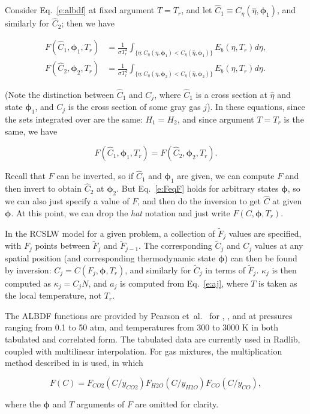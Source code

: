 \documentclass[preprint,12pt, a4paper]{elsarticle}
\newcommand{\BS}{\boldsymbol}
\begin{document}
Consider Eq.~\ref{e:albdf} at fixed argument $T=T_r$, and let $\hat{C}_1\equiv C_\eta(\hat{\eta},\BS{\phi}_1)$, and similarly for $\hat{C}_2$; then we have
%
\begin{linenomath}
    \begin{align} \label{e:albdf2}
        F(\hat{C}_1,\BS{\phi}_1,T_r) &= \frac{1}{\sigma T_r^4}\int_{\{\eta: C_\eta(\eta,\BS{\phi}_1)<C_\eta(\hat{\eta},\BS{\phi}_1)\}}E_b(\eta,T_r)d\eta, \\
        F(\hat{C}_2,\BS{\phi}_2,T_r) &= \frac{1}{\sigma T_r^4}\int_{\{\eta: C_\eta(\eta,\BS{\phi}_2)<C_\eta(\hat{\eta},\BS{\phi}_2)\}}E_b(\eta,T_r)d\eta.
    \end{align}
\end{linenomath}
%
(Note the distinction between $\hat{C}_1$ and $C_j$, where $\hat{C}_1$ is a cross section at $\hat{\eta}$ and state $\BS{\phi}_1$, and $C_j$ is the cross section of some gray gas $j$).
In these equations, since the sets integrated over are the same: $H_1=H_2$, and since argument $T=T_r$ is the same, we have 
%
\begin{linenomath}
    \begin{equation}\label{e:FeqF}
    F(\hat{C}_1,\BS{\phi}_1,T_r)=F(\hat{C}_2,\BS{\phi}_2,T_r).
\end{equation}
\end{linenomath}
%
Recall that $F$ can be inverted, so if $\hat{C}_1$ and $\BS{\phi}_1$ are given, we can compute $F$ and then invert to obtain $\hat{C}_2$ at $\BS{\phi}_2$. But Eq.~\ref{e:FeqF} holds for arbitrary states $\BS{\phi}$, so we can also just specify a value of $F$, and then do the inversion to get $\hat{C}$ at given $\BS{\phi}$. At this point, we can drop the \emph{hat} notation and just write $F(C,\BS{\phi},T_r)$.

In the RCSLW model for a given problem, a collection of $\tilde{F}_j$ values are specified, with $F_j$ points between $\tilde{F}_j$ and $\tilde{F}_{j-1}$. The corresponding $\tilde{C}_j$ and $C_j$ values at any spatial position (and corresponding thermodynamic state $\BS{\phi}$) can then be found by inversion: $C_j = C(F_j,\BS{\phi},T_r)$, and similarly for $\tilde{C}_j$ in terms of $\tilde{F}_j$. $\kappa_j$ is then computed as $\kappa_j=C_jN$, and $a_j$ is computed from Eq.~\ref{e:aj}, where $T$ is taken as the local temperature, not $T_r$.

The ALBDF functions are provided by Pearson et~al.~\cite{Pearson_2014} for , , and  at pressures ranging from 0.1 to 50 atm, and temperatures from 300 to 3000 K in both tabulated and correlated form. The tabulated data are currently used in Radlib, coupled with multilinear interpolation. For gas mixtures, the multiplication method described in \cite{Solovjov_2000} is used, in which 
%
\begin{linenomath}
\begin{equation}
    F(C) = F_{CO2}(C/y_{CO2})F_{H2O}(C/y_{H2O})F_{CO}(C/y_{CO}), 
\end{equation}
\end{linenomath}
%
where the $\BS{\phi}$ and $T$ arguments of $F$ are omitted for clarity.
\end{document}

